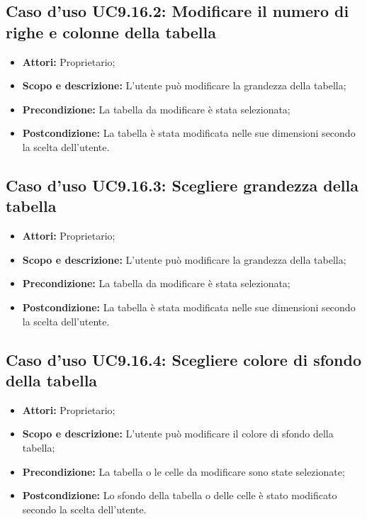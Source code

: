 	\subsection{Caso d'uso UC9.16.2: Modificare il numero di righe e colonne della tabella}
	\begin{itemize}
		\item \textbf{Attori:} Proprietario;
		\item \textbf{Scopo e descrizione:} L'utente può modificare la grandezza della tabella;
		\item \textbf{Precondizione:} La tabella da modificare è stata selezionata;
		\item \textbf{Postcondizione:} La tabella è stata modificata nelle sue dimensioni secondo la scelta dell'utente.
	\end{itemize}
	
	\subsection{Caso d'uso UC9.16.3: Scegliere grandezza della tabella}
	\begin{itemize}
		\item \textbf{Attori:} Proprietario;
		\item \textbf{Scopo e descrizione:} L'utente può modificare la grandezza della tabella;
		\item \textbf{Precondizione:} La tabella da modificare è stata selezionata;
		\item \textbf{Postcondizione:} La tabella è stata modificata nelle sue dimensioni secondo la scelta dell'utente.
	\end{itemize}
	
	\subsection{Caso d'uso UC9.16.4: Scegliere colore di sfondo della tabella}
	\begin{itemize}
		\item \textbf{Attori:} Proprietario;
		\item \textbf{Scopo e descrizione:} L'utente può modificare il colore di sfondo della tabella;
		\item \textbf{Precondizione:} La tabella o le celle da modificare sono state selezionate;
		\item \textbf{Postcondizione:} Lo sfondo della tabella o delle celle è stato modificato secondo la scelta dell'utente.
	\end{itemize}
	
